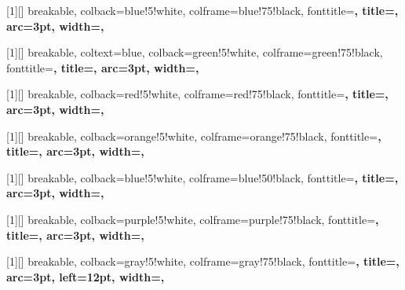 [1][]{
    breakable,
    colback=blue!5!white,
    colframe=blue!75!black,
    fonttitle=\bfseries,
    title={}, 
    arc=3pt,  
    width=\linewidth,
}

[1][]{
    breakable,
    coltext=blue, 
    colback=green!5!white,
    colframe=green!75!black,
    fonttitle=\bfseries,
    title={}, 
    arc=3pt,  
    width=\linewidth,
}

[1][]{
    breakable,
    colback=red!5!white,
    colframe=red!75!black,
    fonttitle=\bfseries,
    title={}, 
    arc=3pt,  
    width=\linewidth,
}

[1][]{
    breakable,
    colback=orange!5!white,
    colframe=orange!75!black,
    fonttitle=\bfseries,
    title={}, 
    arc=3pt,  
    width=\linewidth,
}

[1][]{
    breakable,
    colback=blue!5!white,      %
    colframe=blue!50!black,   %
    fonttitle=\bfseries,
    title={}, 
    arc=3pt,                  %
    width=\linewidth,
}

[1][]{
    breakable,
    colback=purple!5!white,      %
    colframe=purple!75!black,    %
    fonttitle=\bfseries,
    title={}, %
    arc=3pt,                    %
    width=\linewidth,           %
}

[1][]{
    breakable,
    colback=gray!5!white,        %
    colframe=gray!75!black,      %
    fonttitle=\bfseries,
    title={}, %
    arc=3pt,
    left=12pt,
    width=\linewidth,
}